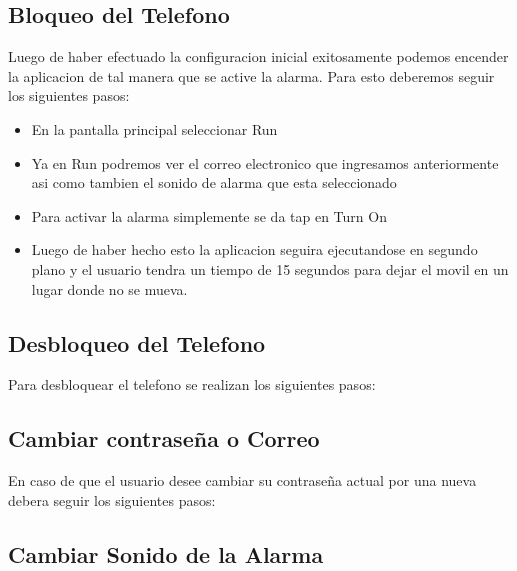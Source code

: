 \documentclass[12pt,letterpaper]{article}
\begin{document}
\subsection{Bloqueo del Telefono}
Luego de haber efectuado la configuracion inicial exitosamente podemos encender la aplicacion de tal manera que se active la alarma. Para esto deberemos seguir los siguientes pasos:

 \begin{itemize}

\item{En la pantalla principal seleccionar Run}
\item{Ya en Run podremos ver el correo electronico que ingresamos anteriormente asi como tambien el sonido de alarma que esta seleccionado}
\item{Para activar la alarma simplemente se da tap en Turn On}
\item{Luego de haber hecho esto la aplicacion seguira ejecutandose en segundo plano y el usuario tendra un tiempo de 15 segundos para dejar el movil en un lugar donde no se mueva.}

\end{itemize}



\subsection{Desbloqueo del Telefono}
Para desbloquear el telefono se realizan los siguientes pasos:

\subsection{Cambiar contraseña o Correo}
En caso de que el usuario desee cambiar su contraseña actual por una nueva debera seguir los siguientes pasos:


\subsection{Cambiar Sonido de la Alarma}
\end{document}
